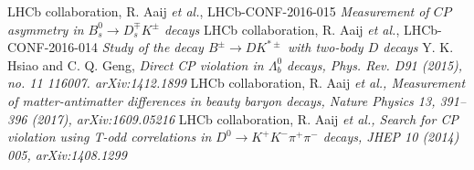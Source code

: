 \documentclass[12pt]{article}
\def\Pb      {\ensuremath{b}\xspace}
\def\PLambda      {\ensuremath{\Lambda}\xspace}
\def\Lz          {{\ensuremath{\PLambda}}\xspace}
\def\bquark    {{\ensuremath{\Pb}}\xspace}
\def\Lb      {{\ensuremath{\Lz^0_\bquark}}\xspace}
\def\CP                {{\ensuremath{C\!P}}\xspace}
\begin{document}
\begin{thebibliography}{99}
  LHCb collaboration, R. Aaij \emph{et al.}, LHCb-CONF-2016-015 \emph{Measurement of \CP asymmetry in $B^0_s\rightarrow D^\mp_sK^\pm$ decays}
  LHCb collaboration, R. Aaij \emph{et al.}, LHCb-CONF-2016-014 \emph{Study of the decay $B^\pm\rightarrow DK^{*\pm}$ with two-body $D$ decays}
Y. K. Hsiao and C. Q. Geng, \emph{Direct CP violation in \Lb decays, Phys. Rev. D91 (2015), no. 11 116007. arXiv:1412.1899}
 LHCb collaboration, R. Aaij \emph{et al., Measurement of matter-antimatter differences in beauty baryon decays, Nature Physics 13, 391–396 (2017), arXiv:1609.05216}
 LHCb collaboration, R. Aaij \emph{et al., Search for CP violation using T-odd correlations in $D^0\rightarrow K^+K^-\pi^+\pi^-$ decays, JHEP 10 (2014) 005, arXiv:1408.1299}

\end{thebibliography}


 
\end{document}

